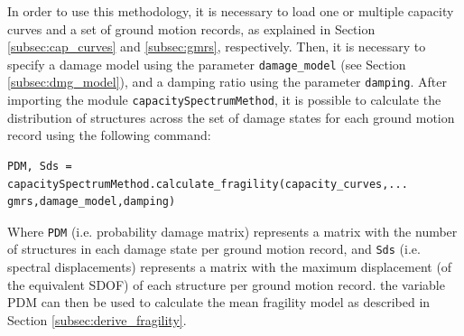 In order to use this methodology, it is necessary to load one or multiple capacity curves and a set of ground motion records, as explained in Section \ref{subsec:cap_curves} and \ref{subsec:gmrs}, respectively. Then, it is necessary to specify a damage model using the parameter \verb=damage_model= (see Section \ref{subsec:dmg_model}), and a damping ratio using the parameter \verb=damping=. After importing the module \verb=capacitySpectrumMethod=, it is possible to calculate the distribution of structures across the set of damage states for each ground motion record using the following command:

\begin{Verbatim}[frame=single, commandchars=\\\{\}, samepage=true]
PDM, Sds = capacitySpectrumMethod.calculate_fragility(capacity_curves,...
gmrs,damage_model,damping)
\end{Verbatim}

Where \verb=PDM= (i.e. probability damage matrix) represents a matrix with the number of structures in each damage state per ground motion record, and \verb=Sds= (i.e. spectral displacements) represents a matrix with the maximum displacement (of the equivalent SDOF) of each structure per ground motion record. the variable PDM can then be used to calculate the mean fragility model as described in Section \ref{subsec:derive_fragility}.



